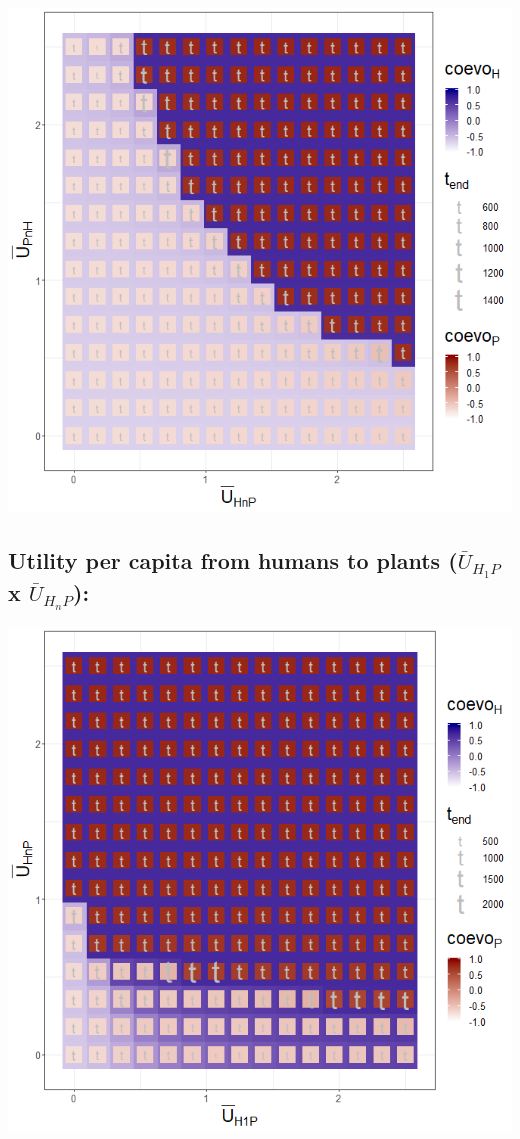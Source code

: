 \documentclass[]{book}
\begin{document}
\includegraphics[width=1\linewidth]{plots/3_twoPar-mU.HnP-mU.PnH_plot}

\newpage

\hypertarget{utility-per-capita-from-humans-to-plants-baru_h_1p-x-baru_h_np}{%
\subsection{\texorpdfstring{Utility per capita from humans to plants (\(\bar{U}_{H_{1}P}\) x \(\bar{U}_{H_{n}P}\)):}{Utility per capita from humans to plants (\textbackslash{}bar\{U\}\_\{H\_\{1\}P\} x \textbackslash{}bar\{U\}\_\{H\_\{n\}P\}):}}\label{utility-per-capita-from-humans-to-plants-baru_h_1p-x-baru_h_np}}

\includegraphics[width=1\linewidth]{plots/3_twoPar-mU.H1P-mU.HnP_plot}
\end{document}
